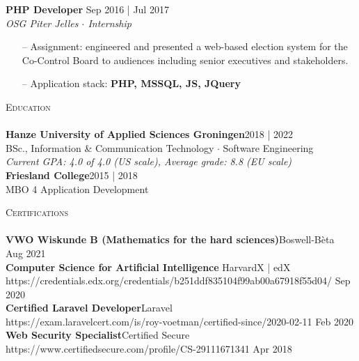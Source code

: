 \documentclass[a4paper]{article}
\newcommand{\lineunder} {
    \vspace*{-8pt} \\
    \hspace*{-18pt} \hrulefill \\
}
\newcommand{\header} [1] {
    {\hspace*{-18pt}\vspace*{6pt} \textsc{#1}}
    \vspace*{-6pt} \lineunder
}
\begin{document}
\textbf{PHP Developer} \hfill \color{gray} Sep 2016 | Jul 2017\color{black}\\
\textit{OSG Piter Jelles $\cdot$ Internship}\\
\vspace{-1mm}
\begin{itemize} \itemsep 1pt
	\item[--] Assignment: engineered and presented a web-based election system for the Co-Control Board to audiences including senior executives and stakeholders.
	\item[--] Application stack: \textbf{PHP, MSSQL, JS, JQuery}
\end{itemize}


\vspace{5mm}

\header{Education}
\vspace{2mm}
\textbf{Hanze University of Applied Sciences Groningen}\hfill \color{gray}2018 | 2022\color{black}\\
BSc., Information \& Communication Technology $\cdot$ Software Engineering\\
\vspace{1mm}
\emph{Current GPA: 4.0 of 4.0 (US scale), Average grade: 8.8 (EU scale)}\\

\vspace{3mm}
\textbf{Friesland College}\hfill \color{gray}2015 | 2018\color{black}\\
MBO 4 Application Development\\

\newpage

\header{Certifications}
\textbf{VWO Wiskunde B (Mathematics for the hard sciences)}\hfill Boswell-Bèta\\
 \hfill \color{gray}Aug 2021\color{black}\\
\vspace{2mm}
\textbf{Computer Science for Artificial Intelligence }\hfill HarvardX | edX\\
\color{gray}https://credentials.edx.org/credentials/b251ddf835104f99ab00a67918f55d04/\color{black} \hfill \color{gray}Sep 2020\color{black}\\
\vspace{2mm}
\textbf{Certified Laravel Developer}\hfill Laravel\\
\color{gray}https://exam.laravelcert.com/is/roy-voetman/certified-since/2020-02-11\color{black} \hfill \color{gray}Feb 2020\color{black}\\
\vspace{2mm}
\textbf{Web Security Specialist}\hfill Certified Secure\\
\color{gray}https://www.certifiedsecure.com/profile/CS-29111671341\color{black} \hfill \color{gray}Apr 2018\color{black}\\
\vspace{2mm}
\end{document}
